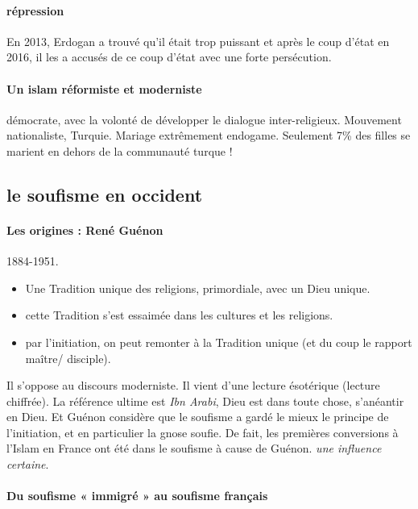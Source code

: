 \paragraph{répression} En 2013, Erdogan a trouvé qu'il était trop puissant et après le coup d'état en 2016, il les a accusés de ce coup d'état avec une forte persécution. 

\paragraph{Un islam réformiste et moderniste} démocrate, avec la volonté de développer le dialogue inter-religieux. Mouvement nationaliste, Turquie. Mariage extrêmement endogame. Seulement 7\% des filles se marient en dehors de la communauté turque !

\subsection{le soufisme en occident}
 \paragraph{Les origines : René Guénon} 1884-1951. 
 \begin{itemize}
     \item  Une Tradition unique des religions, primordiale, avec un Dieu unique. 
     \item cette Tradition s'est essaimée dans les cultures et les religions.
     \item par l'initiation, on peut remonter à la Tradition unique (et du coup le rapport maître/ disciple). 
 \end{itemize}
Il s'oppose au discours moderniste. Il vient d'une lecture ésotérique (lecture chiffrée). La référence ultime est \textit{Ibn Arabi}, Dieu est dans toute chose, s'anéantir en Dieu.  Et Guénon considère que le soufisme a gardé le mieux le principe de l'initiation, et en particulier la gnose soufie. De fait, les premières conversions à l'Islam en France ont été dans le soufisme à cause de Guénon. \textit{une influence certaine}.

     
\paragraph{Du soufisme « immigré » au soufisme français}   

